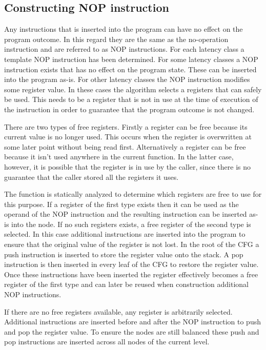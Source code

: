 \subsection{Constructing NOP instruction}
\label{sec:nop}
Any instructions that is inserted into the program can have no effect on the program outcome. In this regard they are the same as the no-operation instruction and are 
referred to as NOP instructions. For each latency class a template NOP instruction has been determined. 
For some latency classes a NOP instruction exists that has no effect on the program state. These can be inserted into the program as-is. 
For other latency classes the NOP instruction modifies some register value. In these cases the algorithm selects a registers that can safely be used. 
This needs to be a register that is not in use at the time of execution of the instruction in order to guarantee that the program outcome is not changed. 

There are two types of free registers. 
Firstly a register can be free because its current value is no longer used.
This occurs when the register is overwritten at some later point without being read first. 
Alternatively a register can be free because it isn't used anywhere in the current function. 
In the latter case, however, it is possible that the register is in use by the caller, since there is no guarantee that the caller stored all the registers it uses. 

The function is statically analyzed to determine which registers are free to use for this purpose. 
If a register of the first type exists then it can be used as the operand of the NOP instruction and the resulting instruction 
can be inserted as-is into the node. 
If no such registers exists, a free register of the second type is selected. 
In this case additional instructions are inserted into the program to ensure that the original value of the register is not lost. 
In the root of the CFG a push instruction is inserted to store the register value onto the stack. 
A pop instruction is then inserted in every leaf of the CFG to restore the register value. 
Once these instructions have been inserted the register effectively becomes a free register of the first type and can 
later be reused when construction additional NOP instructions.

If there are no free registers available, any register is arbitrarily selected. Additional instructions are inserted before and after the NOP instruction to push and pop the register value. To ensure the nodes are 
still balanced these push and pop instructions are inserted across all nodes of the current level. 

